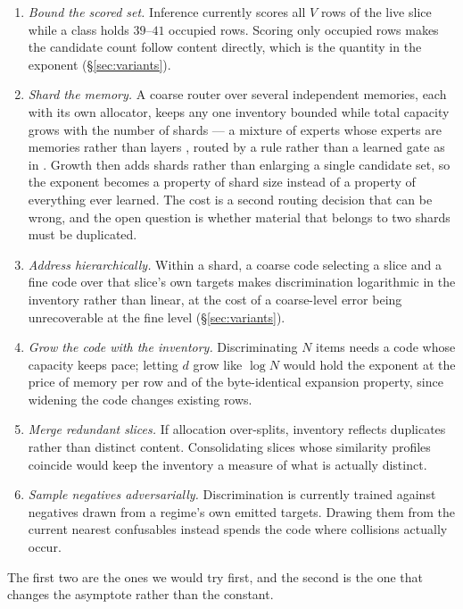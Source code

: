 \documentclass[11pt,a4paper]{article}
\begin{document}
\begin{enumerate}
  \item \emph{Bound the scored set.} Inference currently scores all $V$ rows of
  the live slice while a class holds $39$--$41$ occupied rows. Scoring only
  occupied rows makes the candidate count follow content directly, which is the
  quantity in the exponent (\S\ref{sec:variants}).
  \item \emph{Shard the memory.} A coarse router over several independent
  memories, each with its own allocator, keeps any one inventory bounded while
  total capacity grows with the number of shards --- a mixture of experts whose
  experts are memories rather than layers
  \citep{shazeer2017outrageously,fedus2022switch}, routed by a rule rather than
  a learned gate as in \citet{roller2021hash}. Growth then adds shards
  rather than enlarging a single candidate set, so the exponent becomes a
  property of shard size instead of a property of everything ever learned. The
  cost is a second routing decision that can be wrong, and the open question is
  whether material that belongs to two shards must be duplicated.
  \item \emph{Address hierarchically.} Within a shard, a coarse code selecting a
  slice and a fine code over that slice's own targets makes discrimination
  logarithmic in the inventory rather than linear, at the cost of a coarse-level
  error being unrecoverable at the fine level (\S\ref{sec:variants}).
  \item \emph{Grow the code with the inventory.} Discriminating $N$ items needs
  a code whose capacity keeps pace; letting $d$ grow like $\log N$ would hold
  the exponent at the price of memory per row and of the byte-identical
  expansion property, since widening the code changes existing rows.
  \item \emph{Merge redundant slices.} If allocation over-splits, inventory
  reflects duplicates rather than distinct content. Consolidating slices whose
  similarity profiles coincide would keep the inventory a measure of what is
  actually distinct.
  \item \emph{Sample negatives adversarially.} Discrimination is currently
  trained against negatives drawn from a regime's own emitted targets. Drawing
  them from the current nearest confusables instead spends the code where
  collisions actually occur.
\end{enumerate}

The first two are the ones we would try first, and the second is the one that
changes the asymptote rather than the constant.
\end{document}
